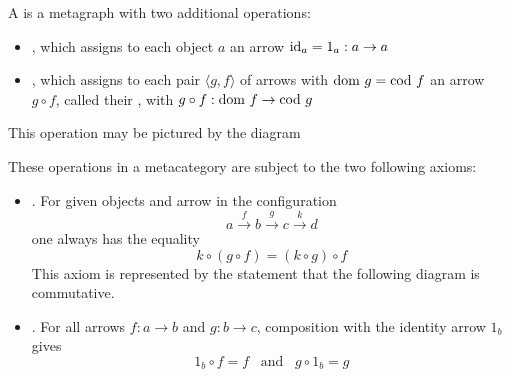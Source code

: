 \documentclass[11pt,letterpaper]{jacky}
\begin{document}
\begin{defi}
    A  is a metagraph with two additional operations:
    \begin{itemize}
        \item {}, which assigns to each object $a$ an arrow
            $\text{id}_{a}=1_a:a\rightarrow a$
        \item {}, which assigns to each pair $\langle g,f
            \rangle$ of arrows with $\dom[g]=\cod[f]$ an arrow $g\circ f$,
            called their , with $g\circ
            f:\dom[f]\rightarrow\cod[g]$
    \end{itemize}
    This operation may be pictured by the diagram
    \begin{center}
    \end{center}
    These operations in a metacategory are subject to the two following axioms:
    \begin{itemize}
        \item {}. For given objects and arrow in the
            configuration
            \[a\xrightarrow{f}b\xrightarrow{g}c\xrightarrow{k}d\]
            one always has the equality
            \[k\circ\left(g\circ f\right)=\left(k\circ g\right)\circ f\]
            This axiom is represented by the statement that the following
            diagram is commutative.
            \begin{center}
            \end{center}
        \item {}. For all arrows $f:a\rightarrow b$ and
            $g:b\rightarrow c$, composition with the identity arrow $1_b$ gives
            \[1_b\circ f=f\hspace{10pt}\text{and}\hspace{10pt}g\circ1_b=g\]

\end{itemize}
\end{defi}
\end{document}
